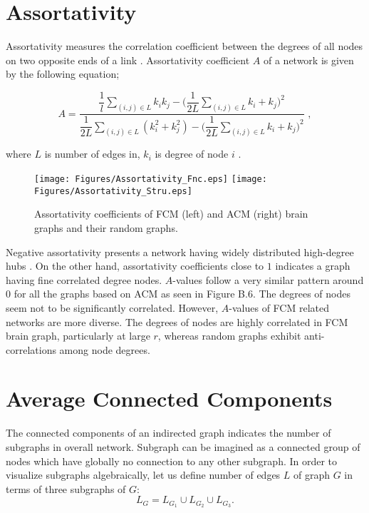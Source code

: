 \section{Assortativity}

Assortativity measures the correlation coefficient between the degrees of all nodes on two opposite ends of a link \citep{RUB10}. Assortativity coefficient $A$ of a network is given by the following equation; 

\begin{equation}
A = \frac{\dfrac{1}{l} \sum\limits_{(i,j) \in L}  k_i k_j -  \Big ( \dfrac{1}{2L} \sum\limits_{(i,j) \in L}k_i + k_j  \Big )^2}{\dfrac{1}{2L}\sum\limits_{(i,j) \in L} ( k_i^2+  k_j^2) -\Big ( \dfrac{1}{2L} \sum\limits_{(i,j) \in L}k_i + k_j  \Big )^2 } \,\, ,
\end{equation}

where $L$ is number of edges in, $k_i$ is degree of node $i$ \citep{NEW02a}.


\begin{figure}[htbp]
 
  \centering
	 \texttt{[image: Figures/Assortativity\_Fnc.eps]}
	 \texttt{[image: Figures/Assortativity\_Stru.eps]}
  \caption[Assortativity]{Assortativity coefficients of FCM (left) and ACM (right) brain graphs and their random graphs.} 
    \label{fig:Assortativity}
 	
\end{figure}

Negative assortativity presents a network having widely distributed high-degree hubs \citep{RUB10}. On the other hand, assortativity coefficients close to $1$ indicates a graph having fine correlated degree nodes. $A$-values follow a very similar pattern around 0 for all the graphs based on ACM as seen in Figure B.6. The degrees of nodes seem not to be significantly correlated. However, $A$-values of FCM related networks are more diverse. The degrees of nodes are highly correlated in FCM brain graph, particularly at large $r$, whereas random graphs exhibit anti-correlations among node degrees.   

\section{Average Connected Components}
The connected components of an indirected graph indicates the number of subgraphs in overall network. Subgraph can be imagined as a connected group of nodes which have globally no connection to any other subgraph. In order to visualize subgraphs algebraically, let us define number of edges $L$ of graph $G$ in terms of three subgraphs of $G$:
\begin{equation}
L_G = L_{G_1}\cup L_{G_2}\cup L_{G_3} . 
\end{equation} 

